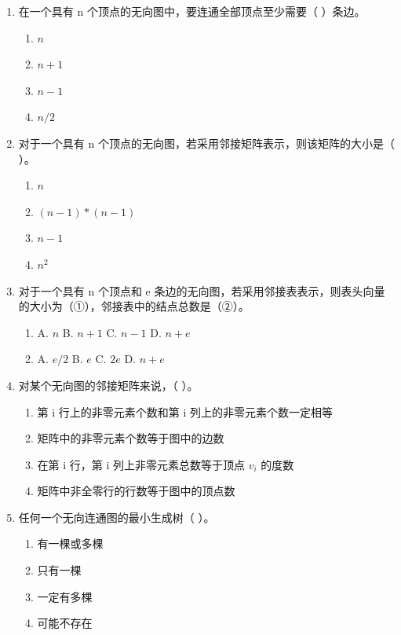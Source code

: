 \documentclass[12pt, a4paper]{article}
\begin{document}
\begin{enumerate}
    \item 在一个具有 n 个顶点的无向图中，要连通全部顶点至少需要（ ）条边。
    \begin{enumerate}
        \item[A.] $n$
        \item[B.] $n+1$
        \item[C.] $n-1$
        \item[D.] $n/2$
    \end{enumerate}
    
    \item 对于一个具有 n 个顶点的无向图，若采用邻接矩阵表示，则该矩阵的大小是（ ）。
    \begin{enumerate}
        \item[A.] $n$
        \item[B.] $(n-1)*(n-1)$
        \item[C.] $n-1$
        \item[D.] $n^2$
    \end{enumerate}
    
    \item 对于一个具有 n 个顶点和 e 条边的无向图，若采用邻接表表示，则表头向量的大小为（①），邻接表中的结点总数是（②）。
    \begin{enumerate}
        \item[①] A. $n$ \quad B. $n+1$ \quad C. $n-1$ \quad D. $n+e$
        \item[②] A. $e/2$ \quad B. $e$ \quad C. $2e$ \quad D. $n+e$
    \end{enumerate}
    
    \item 对某个无向图的邻接矩阵来说，（ ）。
    \begin{enumerate}
        \item[A.] 第 i 行上的非零元素个数和第 i 列上的非零元素个数一定相等
        \item[B.] 矩阵中的非零元素个数等于图中的边数
        \item[C.] 在第 i 行，第 i 列上非零元素总数等于顶点 $v_i$ 的度数
        \item[D.] 矩阵中非全零行的行数等于图中的顶点数
    \end{enumerate}
    
    \item 任何一个无向连通图的最小生成树（ ）。
    \begin{enumerate}
        \item[A.] 有一棵或多棵
        \item[B.] 只有一棵
        \item[C.] 一定有多棵
        \item[D.] 可能不存在
    \end{enumerate}
    

\end{enumerate}
\end{document}
